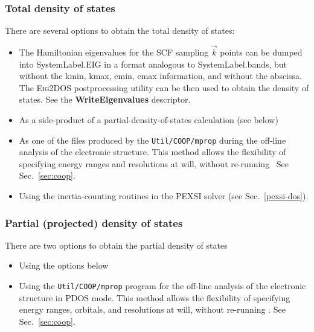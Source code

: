 \subsubsection{Total density of states}
There are several options to obtain the
total density of states:
\begin{itemize}
\item The Hamiltonian eigenvalues for the SCF sampling $\vec k$ points can be
dumped into SystemLabel.EIG in a format analogous to SystemLabel.bands,
but without the kmin, kmax, emin, emax information, and without
the abscissa. The \textsc{Eig2DOS}
postprocessing utility can be then used to obtain the density of
states.
See the \textbf{WriteEigenvalues} descriptor.
%
\item As a side-product of a partial-density-of-states calculation
  (see below)
\item As one of the files produced by the \texttt{Util/COOP/mprop} during
  the off-line analysis of the electronic structure. This method
  allows the flexibility of specifying energy ranges and resolutions
  at will, without re-running \siesta\ See Sec.~\ref{sec:coop}.
\item Using the inertia-counting routines in the PEXSI solver (see Sec.~\ref{pexsi-dos}).
\end{itemize}

\subsubsection{Partial (projected) density of states}

There are two options to obtain the partial density of states
\begin{itemize}
\item Using the options below
\item Using the \texttt{Util/COOP/mprop} program for the off-line analysis of
  the electronic structure in PDOS mode. This method allows the
  flexibility of specifying energy ranges, orbitals, and resolutions
  at will, without re-running \siesta. See Sec.~\ref{sec:coop}.
\end{itemize}

